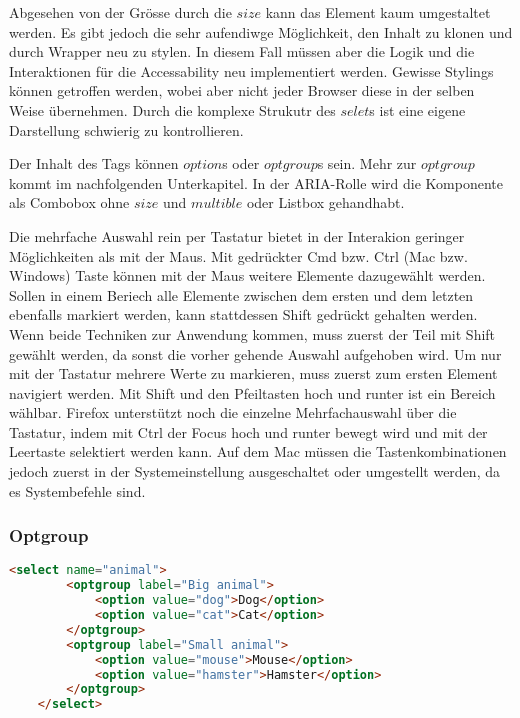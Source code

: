 Abgesehen von der Grösse durch die $size$ kann das Element kaum umgestaltet werden.
Es gibt jedoch die sehr aufendiwge Möglichkeit, den Inhalt zu klonen und durch Wrapper neu zu stylen.
In diesem Fall müssen aber die Logik und die Interaktionen für die Accessability neu implementiert werden.
Gewisse Stylings können getroffen werden, wobei aber nicht jeder Browser diese in der selben Weise übernehmen.
Durch die komplexe Strukutr des $selet$s ist eine eigene Darstellung schwierig zu kontrollieren.

Der Inhalt des Tags können $option$s oder $optgroup$s sein.
Mehr zur $optgroup$ kommt im nachfolgenden Unterkapitel.
In der ARIA-Rolle wird die Komponente als Combobox ohne $size$ und $multible$ oder Listbox gehandhabt.

Die mehrfache Auswahl rein per Tastatur bietet in der Interakion geringer Möglichkeiten als mit der Maus.
Mit gedrückter Cmd bzw. Ctrl (Mac bzw. Windows) Taste können mit der Maus weitere Elemente dazugewählt werden.
Sollen in einem Beriech alle Elemente zwischen dem ersten und dem letzten ebenfalls markiert werden, kann stattdessen Shift gedrückt gehalten werden.
Wenn beide Techniken zur Anwendung kommen, muss zuerst der Teil mit Shift gewählt werden, da sonst die vorher gehende Auswahl aufgehoben wird.
Um nur mit der Tastatur mehrere Werte zu markieren, muss zuerst zum ersten Element navigiert werden.
Mit Shift und den Pfeiltasten hoch und runter ist ein Bereich wählbar.
Firefox unterstützt noch die einzelne Mehrfachauswahl über die Tastatur, indem mit Ctrl der Focus hoch und runter bewegt wird und mit der Leertaste selektiert werden kann.
Auf dem Mac müssen die Tastenkombinationen jedoch zuerst in der Systemeinstellung ausgeschaltet oder umgestellt werden, da es Systembefehle sind.


\subsubsection{Optgroup}

\begin{lstlisting}[language = html, caption = Code: Optgroup Example, label = code:OptgroupExample]
    <select name="animal">
        <optgroup label="Big animal">
            <option value="dog">Dog</option>
            <option value="cat">Cat</option>
        </optgroup>
        <optgroup label="Small animal">
            <option value="mouse">Mouse</option>
            <option value="hamster">Hamster</option>
        </optgroup>
    </select>
\end{lstlisting}

